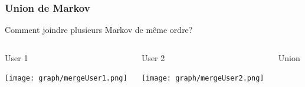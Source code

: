 \documentclass{beamer}
\begin{document}
            \begin{frame}
                \frametitle{Union de Markov}
                Comment joindre plusieurs Markov de même ordre?
                \pause[2]
                \begin{columns}[t]
                    \begin{column}{3cm}
                        \begin{exampleblock}{User 1}
                            \begin{center}
                                \texttt{[image: graph/mergeUser1.png]}
                            \end{center}
                        \end{exampleblock}
                    \end{column}
                    \begin{column}{3cm}
                        \begin{exampleblock}{User 2}
                            \begin{center}
                                \texttt{[image: graph/mergeUser2.png]}
                            \end{center}
                        \end{exampleblock}
                    \end{column}
                    \pause[3]
                    \begin{column}{3cm}
                        \begin{exampleblock}{Union}
                            \begin{center}
                                \pause[4]
                            \end{center}
                        \end{exampleblock}
                    \end{column}
                \end{columns}
            \end{frame}
\end{document}
